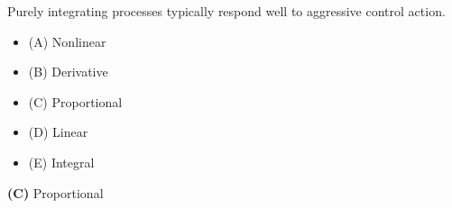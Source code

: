 

Purely integrating processes typically respond well to aggressive \underbar{\hskip 50pt} control action.

\begin{itemize}
\item{(A)} Nonlinear
\vskip 5pt 
\item{(B)} Derivative
\vskip 5pt 
\item{(C)} Proportional
\vskip 5pt 
\item{(D)} Linear
\vskip 5pt 
\item{(E)} Integral
\end{itemize}







{\bf (C)} Proportional












